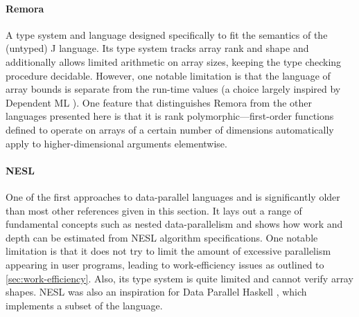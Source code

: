 \documentclass[acmsmall,screen,nonacm]{acmart}
\begin{document}

\paragraph{Remora \cite{slepak2014remora}}
\label{sec:remora}
A type system and language designed specifically to fit the semantics of the (untyped) J language.
Its type system tracks array rank and shape and additionally allows limited arithmetic on array sizes, keeping the type checking procedure decidable.
However, one notable limitation is that the language of array bounds is separate from the run-time values (a choice largely inspired by Dependent ML \cite{xi2007dependentml}).
One feature that distinguishes Remora from the other languages presented here is that it is rank polymorphic---first-order functions defined to operate on arrays of a certain number of dimensions automatically apply to higher-dimensional arguments elementwise.

\paragraph{NESL \cite{blelloch1993nesl}}
\label{sec:nesl}
One of the first approaches to data-parallel languages and is significantly older than most other references given in this section.
It lays out a range of fundamental concepts such as nested data-parallelism and shows how work and depth can be estimated from NESL algorithm specifications.
One notable limitation is that it does not try to limit the amount of excessive parallelism appearing in user programs, leading to work-efficiency issues as outlined to \cref{sec:work-efficiency}.
Also, its type system is quite limited and cannot verify array shapes.
NESL was also an inspiration for Data Parallel Haskell \cite{peytonjones2008parallelhaskell}, which implements a subset of the language.
\end{document}
